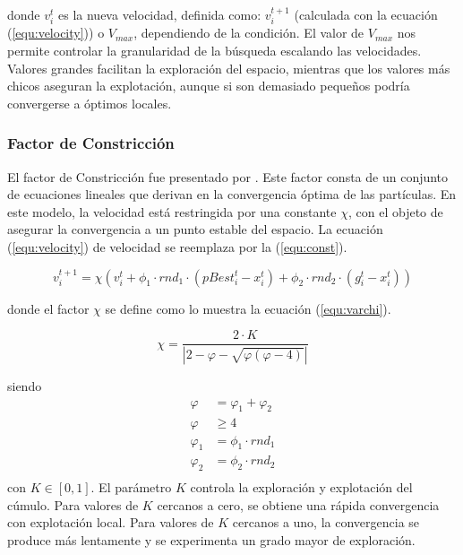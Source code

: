   donde $v^{t}_i$ es la nueva velocidad, definida como: $v^{t+1}_i$ (calculada con la ecuaci\'on (\ref{equ:velocity})) o $V_{max}$, dependiendo de 
  la condici\'on. El valor de $V_{max}$ nos permite controlar la granularidad de la b\'usqueda escalando las velocidades. Valores 
  grandes facilitan la exploraci\'on del espacio, mientras que los valores m\'as chicos aseguran la explotaci\'on, aunque si son demasiado 
  peque\~nos podr\'ia convergerse a \'optimos locales. 
  
    \subsubsection{Factor de Constricci\'on}
  
  El factor de Constricci\'on fue presentado por \cite{clerc99}. Este factor consta de un conjunto de ecuaciones lineales que 
  derivan en la convergencia \'optima de las part\'iculas. En este modelo, la velocidad est\'a restringida por una
  constante $\chi$, con el objeto de asegurar la convergencia a un punto estable del espacio. La ecuaci\'on (\ref{equ:velocity})
  de velocidad se reemplaza por la (\ref{equ:const}).

    \begin{equation}
	  v^{t+1}_{i} = \chi \left( v^t_i + \phi_1 \cdot rnd_1 \cdot \left(pBest^t_i - x^t_i \right) 
					    + \phi_2 \cdot rnd_2 \cdot \left(g^t_i - x^t_i \right) \right) 
      \label{equ:const}
   \end{equation}
  
  donde el factor $\chi$ se define como lo muestra la ecuaci\'on (\ref{equ:varchi}).
  
  \begin{equation}
	  \chi = \frac{2 \cdot K}{|2- \varphi - \sqrt{\varphi \left(\varphi - 4\right)}|} 
      \label{equ:varchi}
   \end{equation}
  
siendo
\begin{align*}
  \varphi &= \varphi_1 + \varphi_2 \\
  \varphi &\geq 4 \\
  \varphi_1 &= \phi_1 \cdot rnd_1 \\
  \varphi_2 &= \phi_2 \cdot rnd_2 \\  
\end{align*}
  con $K \in[0,1]$. El par\'ametro $K$ controla la exploraci\'on y explotaci\'on del c\'umulo. Para valores de $K$ cercanos a cero, se 
  obtiene una r\'apida convergencia con explotaci\'on local. Para valores de $K$ cercanos a uno, la convergencia se produce 
  m\'as lentamente y se experimenta un grado mayor de exploraci\'on. 

